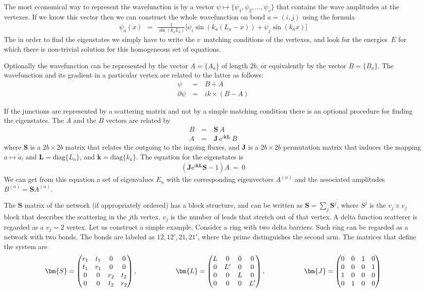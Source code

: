 \documentclass[onecolumn,fleqn, 11pt]{revtex4}
\newcommand{\eexp}{\mathrm{e}^}
\newcommand{\amatrix}[1]{\begin{matrix} #1 \end{matrix}}
\newcommand{\beq}{\begin{eqnarray}}
\newcommand{\eeq}{\end{eqnarray}}
\begin{document}
The most economical way to represent the wavefunction is 
by a vector ${\psi \mapsto \{\psi_1,\psi_2,...,\psi_v\}}$ 
that contains the wave amplitudes at the vertexes. 
If we know this vector then we can construct the whole 
wavefunction on bond ${a=(i,j)}$ using the formula
\beq
\psi_a(x) \ \ = \ \ 
\frac{1}{\sin(k_aL_a)}
\Big[ 
\psi_i \sin(k_a(L_a{-}x))+\psi_j \sin(k_a x)
\Big]
\eeq
The in order to find the eigenstates we simply have 
to write the $v$~matching conditions of the vertexes, 
and look for the energies~$E$ for which there is non-trivial 
solution for this homogeneous set of equations.   


Optionally the wavefunction can be represented 
by the vector $A = \{A_a\}$ of length $2b$, 
or equivalently by the vector $B = \{ B_a \}$. 
The wavefunction and its gradient in a particular vertex 
are related to the latter as follows:    
\beq
\psi \ &=& \ B + A \\
\partial\psi \ &=& \ ik \times (B-A) 
\eeq

 

If the junctions are represented by a scattering matrix and 
not by a simple matching condition there is an optional 
procedure for finding the eigenstates. 
The $A$ and the $B$ vectors are related by 
\beq
B \ &=& \ \bm{S} \ A \\
A \ &=& \ \bm{J} \ \eexp{i\bm{k}\bm{L}} \ B 
\eeq
where $\bm{S}$ is a $2b\times 2b$ matrix 
that relates the outgoing to the ingoing fluxes,  
and $\bm{J}$ is a $2b\times 2b$ permutation matrix 
that induces the mapping $a\mapsto\tilde{a}$, 
and $\bm{L} = \mbox{diag}\{ L_a \}$, 
and  $\bm{k} = \mbox{diag}\{ k_a \}$.
The equation for the eigenstates is
\beq
\left(\bm{J}\eexp{i\bm{k}\bm{L}} \bm{S}-1\right) A \ = \ 0
\eeq
We can get from this equation 
a set of eigenvalues $E_n$ with the corresponding 
eigenvectors $A^{(n)}$ and the associated  
amplitudes $B^{(n)}=\bm{S}A^{(n)}$.


The $\bm{S}$ matrix of the network (if appropriately ordered) 
has a block structure, and can be written as 
$\bm{S} = \sum_j \bm{S}^j$, where $S^j$ is the $v_j\times v_j$ block 
that describes the scattering in the $j$th vertex.
$v_j$ is the number of leads that stretch out of that vertex.
A delta function scatterer is regarded as a $v_j=2$ vertex. 
Let us construct a simple example. 
Consider a ring with two delta barriers.
Such ring can be regarded as a network with 
two bonds. The bonds are labeled as   
$12,12',21,21'$, 
where the prime distinguishes the second arm.
The matrices that define the system are 
\beq
\bm{S} = \left(
\amatrix{
r_1 & t_1 & 0 & 0 \cr
t_1 & r_1 & 0 & 0 \cr
0 & 0 & r_2 & t_2 \cr
0 & 0 & t_2 & r_2 \cr
}\right),
\ \ \ \ \ \ \ \ \ \ \ \ \ \ \ \ \ 
\bm{L} = \left(
\amatrix{
L & 0 & 0 & 0 \cr
0 & L' & 0 & 0 \cr
0 & 0 & L & 0 \cr
0 & 0 & 0 & L' \cr
}\right), 
\ \ \ \ \ \ \ \ \ \ \ \ \ \ \ \ \ 
\bm{J} = \left(
\amatrix{
0 & 0 & 1 & 0 \cr
0 & 0 & 0 & 1 \cr
1 & 0 & 0 & 0 \cr
0 & 1 & 0 & 0 \cr
}\right)
\eeq
\end{document}

